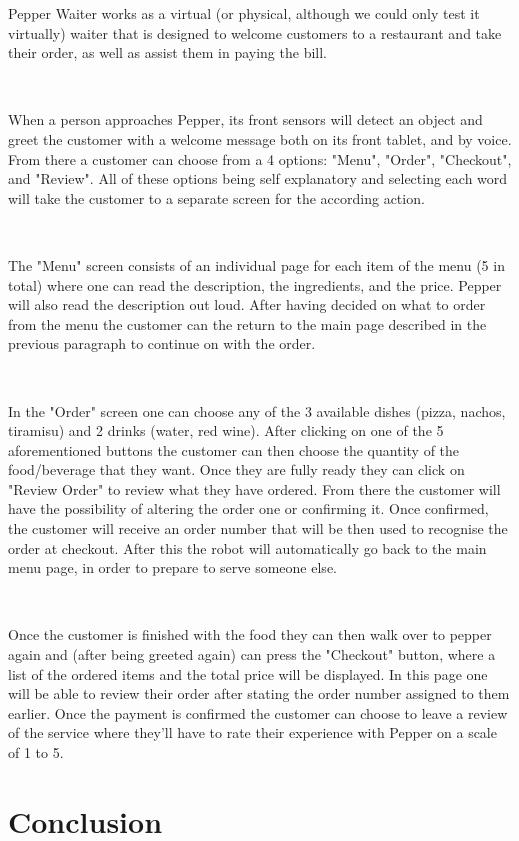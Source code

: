 \documentclass[12pt, letterpaper, twoside]{article}
\begin{document}
Pepper Waiter works as a virtual (or physical, although we could only test it virtually) waiter that is designed to welcome customers to a restaurant and take their order, as well as assist them in paying the bill.

\

When a person approaches Pepper, its front sensors will detect an object and greet the customer with a welcome message both on its front tablet, and by voice. From there a customer can choose from a 4 options: "Menu", "Order", "Checkout", and "Review". All of these options being self explanatory and selecting each word will take the customer to a separate screen for the according action. 

\

The "Menu" screen consists of an individual page for each item of the menu (5 in total) where one can read the description, the ingredients, and the price. Pepper will also read the description out loud. After having decided on what to order from the menu the customer can the return to the main page described in the previous paragraph to continue on with the order.

\

In the "Order" screen one can choose any of the 3 available dishes (pizza, nachos, tiramisu) and 2 drinks (water, red wine). After clicking on one of the 5 aforementioned	buttons the customer can then choose the quantity of the food/beverage that they want. Once they are fully ready they can click on "Review Order" to review what they have ordered. From there the customer will have the possibility of altering the order one or confirming it. Once confirmed, the customer will receive an order number that will be then used to recognise the order at checkout. After this the robot will automatically go back to the main menu page, in order to prepare to serve someone else.

\

Once the customer is finished with the food they can then walk over to pepper again and (after being greeted again) can press the "Checkout" button, where a list of the ordered items and the total price will be displayed. In this page one will be able to review their order after stating the order number assigned to them earlier. Once the payment is confirmed the customer can choose to leave a review of the service where they'll have to rate their experience with Pepper on a scale of 1 to 5. 




\section{Conclusion}
\end{document}
